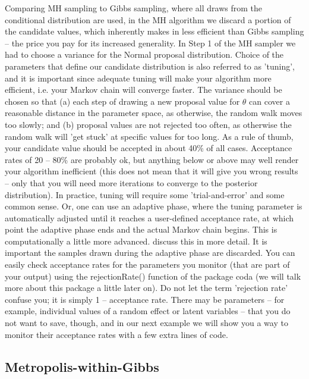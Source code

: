 Comparing MH sampling to Gibbs sampling, where all draws from the conditional distribution are used, in the MH algorithm we discard a portion of the candidate values, which inherently makes in less efficient than Gibbs sampling – the price you pay for its increased generality.  
In Step 1 of the MH sampler we had to choose a variance for the Normal proposal distribution. Choice of the parameters that define our candidate distribution is also referred to as 'tuning', and it is important since adequate tuning will make your algorithm more efficient, i.e. your Markov chain will converge faster. The variance should be chosen so that (a) each step of drawing a new proposal value for $\theta$ can cover a reasonable distance in the parameter space, as otherwise, the random walk moves too slowly; and (b) proposal values are not rejected too often, as otherwise the random walk will 'get stuck' at specific values for too long.  As a rule of thumb, your candidate value should be accepted in about 40\% of all cases. Acceptance rates of 20 – 80\% are probably ok, but anything below or above may well render your algorithm inefficient (this does not mean that it will give you wrong results – only that you will need more iterations to converge to the posterior distribution). In practice, tuning will require some 'trial-and-error' and some common sense. Or, one can use an adaptive phase, where the tuning parameter is automatically adjusted until it reaches a user-defined acceptance rate, at which point the adaptive phase ends and the actual Markov chain begins. This is computationally a little more advanced. \citet{link_barker:2009} discuss this in more detail. It is important the samples drawn during the adaptive phase are discarded.
You can easily check acceptance rates for the parameters you monitor (that are part of your output) using the rejectionRate() function of the package coda (we will talk more about this package a little later on). Do not let the term 'rejection rate' confuse you; it is simply 1 – acceptance rate. There may be parameters – for example, individual values of a random effect or latent variables – that you do not want to save, though, and in our next example we will show you a way to monitor their acceptance rates with a few extra lines of code. 

\subsection{ Metropolis-within-Gibbs }

